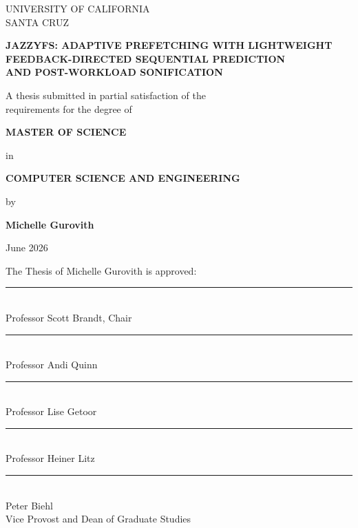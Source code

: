 \documentclass[12pt]{report}
\begin{document}

\begin{titlepage}
    \centering

    {\large UNIVERSITY OF CALIFORNIA}\\[0.1in]
    {\large SANTA CRUZ}

    \vspace{0.5in}

    {\large \textbf{JAZZYFS: ADAPTIVE PREFETCHING WITH LIGHTWEIGHT\\
    FEEDBACK-DIRECTED SEQUENTIAL PREDICTION\\
    AND POST-WORKLOAD SONIFICATION}}

    \vspace{0.4in}

    {\normalsize A thesis submitted in partial satisfaction of the\\
    requirements for the degree of}

    \vspace{0.3in}

    {\large \textbf{MASTER OF SCIENCE}}

    \vspace{0.2in}

    {\normalsize in}

    \vspace{0.2in}

    {\large \textbf{COMPUTER SCIENCE AND ENGINEERING}}

    \vspace{0.4in}

    {\normalsize by}

    \vspace{0.2in}

    {\large \textbf{Michelle Gurovith}}

    \vspace{0.4in}

    {\normalsize June 2026}

    \vspace{0.6in}

    \begin{flushleft}
    The Thesis of Michelle Gurovith is approved:\\[0.3in]
    \rule{3in}{0.4pt}\\
    Professor Scott Brandt, Chair\\[0.3in]
    \rule{3in}{0.4pt}\\
    Professor Andi Quinn\\[0.3in]
    \rule{3in}{0.4pt}\\
    Professor Lise Getoor\\[0.3in]
    \rule{3in}{0.4pt}\\
    Professor Heiner Litz\\[0.5in]
    \rule{3in}{0.4pt}\\
    Peter Biehl\\
    Vice Provost and Dean of Graduate Studies
    \end{flushleft}

\end{titlepage}
\end{document}
